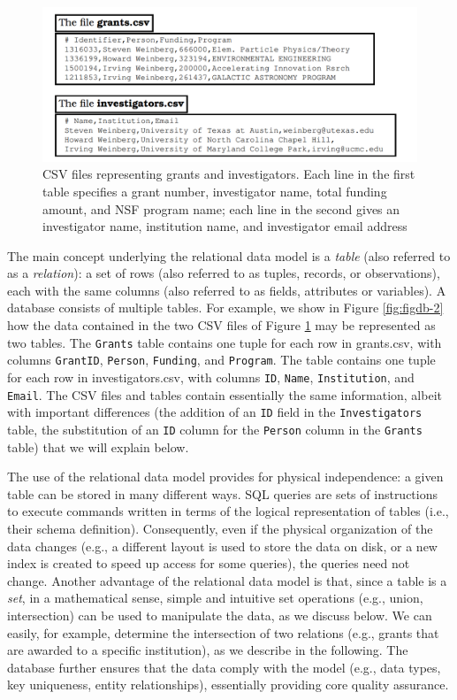 \documentclass[]{krantz}
\begin{document}
\begin{figure}

{\centering \includegraphics[width=0.7\linewidth]{ChapterDB/figures/figdb-1} 

}

\caption{CSV files representing grants and investigators. Each line in the first table specifies a grant number, investigator name, total funding amount, and NSF program name; each line in the second gives an investigator name, institution name, and investigator email address}\label{fig:figdb-1}
\end{figure}

The main concept underlying the relational data model is a \emph{table}
(also referred to as a \emph{relation}): a set of rows (also referred to
as tuples, records, or observations), each with the same columns (also
referred to as fields, attributes or variables). A database consists of
multiple tables. For example, we show in Figure \ref{fig:figdb-2} how
the data contained in the two CSV files of Figure \ref{fig:figdb-1} may
be represented as two tables. The \texttt{Grants} table contains one
tuple for each row in grants.csv, with columns \texttt{GrantID},
\texttt{Person}, \texttt{Funding}, and \texttt{Program}. The table
contains one tuple for each row in investigators.csv, with columns
\texttt{ID}, \texttt{Name}, \texttt{Institution}, and \texttt{Email}.
The CSV files and tables contain essentially the same information,
albeit with important differences (the addition of an \texttt{ID} field
in the \texttt{Investigators} table, the substitution of an \texttt{ID}
column for the \texttt{Person} column in the \texttt{Grants} table) that
we will explain below.

The use of the relational data model provides for physical independence:
a given table can be stored in many different ways. SQL queries are sets
of instructions to execute commands written in terms of the logical
representation of tables (i.e., their schema definition). Consequently,
even if the physical organization of the data changes (e.g., a different
layout is used to store the data on disk, or a new index is created to
speed up access for some queries), the queries need not change. Another
advantage of the relational data model is that, since a table is a
\emph{set}, in a mathematical sense, simple and intuitive set operations
(e.g., union, intersection) can be used to manipulate the data, as we
discuss below. We can easily, for example, determine the intersection of
two relations (e.g., grants that are awarded to a specific institution),
as we describe in the following. The database further ensures that the
data comply with the model (e.g., data types, key uniqueness, entity
relationships), essentially providing core quality assurance.
\end{document}
